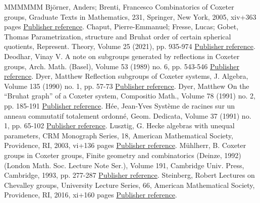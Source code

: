 \begin{thebibliography}{MMMMMM}
 Björner, Anders; Brenti, Francesco Combinatorics of Coxeter groups, Graduate Texts in Mathematics, 231, Springer, New York, 2005, xiv+363 pages \href{https://alco.centre-mersenne.org/articles/10.5802/alco.394/#BB}{Publisher reference}.
 Chaput, Pierre-Emmanuel; Fresse, Lucas; Gobet, Thomas Parametrization, structure and Bruhat order of certain spherical quotients, Represent. Theory, Volume 25 (2021), pp. 935-974 \href{https://alco.centre-mersenne.org/articles/10.5802/alco.394/#CFG}{Publisher reference}.
 Deodhar, Vinay V. A note on subgroups generated by reflections in Coxeter groups, Arch. Math. (Basel), Volume 53 (1989) no. 6, pp. 543-546 \href{https://alco.centre-mersenne.org/articles/10.5802/alco.394/#Deodhar}{Publisher reference}.
 Dyer, Matthew Reflection subgroups of Coxeter systems, J. Algebra, Volume 135 (1990) no. 1, pp. 57-73 \href{https://alco.centre-mersenne.org/articles/10.5802/alco.394/#Dyer_subgroups}{Publisher reference}.
 Dyer, Matthew On the “Bruhat graph” of a Coxeter system, Compositio Math., Volume 78 (1991) no. 2, pp. 185-191 \href{https://alco.centre-mersenne.org/articles/10.5802/alco.394/#Dyer_Bruhat}{Publisher reference}.
 Hée, Jean-Yves Système de racines sur un anneau commutatif totalement ordonné, Geom. Dedicata, Volume 37 (1991) no. 1, pp. 65-102 \href{https://alco.centre-mersenne.org/articles/10.5802/alco.394/#Hee_1}{Publisher reference}.
 Lusztig, G. Hecke algebras with unequal parameters, CRM Monograph Series, 18, American Mathematical Society, Providence, RI, 2003, vi+136 pages \href{https://alco.centre-mersenne.org/articles/10.5802/alco.394/#Lus_book}{Publisher reference}.
 Mühlherr, B. Coxeter groups in Coxeter groups, Finite geometry and combinatorics (Deinze, 1992) (London Math. Soc. Lecture Note Ser.), Volume 191, Cambridge Univ. Press, Cambridge, 1993, pp. 277-287 \href{https://alco.centre-mersenne.org/articles/10.5802/alco.394/#muhlh}{Publisher reference}.
 Steinberg, Robert Lectures on Chevalley groups, University Lecture Series, 66, American Mathematical Society, Providence, RI, 2016, xi+160 pages \href{https://alco.centre-mersenne.org/articles/10.5802/alco.394/#Steinberg}{Publisher reference}.
\end{thebibliography}
